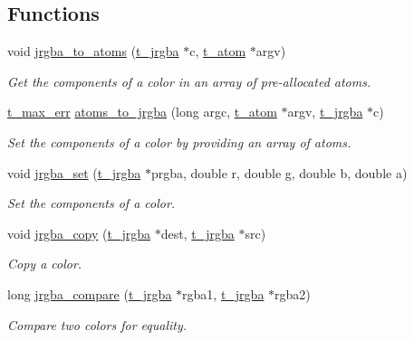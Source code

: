 \subsection*{Functions}
\begin{DoxyCompactItemize}
\item 
void \hyperlink{group__color_ga847dd3f1a2640660f12a14fab259afa8}{jrgba\_\-to\_\-atoms} (\hyperlink{structt__jrgba}{t\_\-jrgba} $\ast$c, \hyperlink{structt__atom}{t\_\-atom} $\ast$argv)
\begin{DoxyCompactList}\small\item\em Get the components of a color in an array of pre-\/allocated atoms. \item\end{DoxyCompactList}\item 
\hyperlink{group__datatypes_ga73edaae82b318855cc09fac994918165}{t\_\-max\_\-err} \hyperlink{group__color_ga78325ce33d8e74c79c4f1adeef3e36f7}{atoms\_\-to\_\-jrgba} (long argc, \hyperlink{structt__atom}{t\_\-atom} $\ast$argv, \hyperlink{structt__jrgba}{t\_\-jrgba} $\ast$c)
\begin{DoxyCompactList}\small\item\em Set the components of a color by providing an array of atoms. \item\end{DoxyCompactList}\item 
void \hyperlink{group__color_ga322f6e69277981f02effe1212affed3c}{jrgba\_\-set} (\hyperlink{structt__jrgba}{t\_\-jrgba} $\ast$prgba, double r, double g, double b, double a)
\begin{DoxyCompactList}\small\item\em Set the components of a color. \item\end{DoxyCompactList}\item 
void \hyperlink{group__color_ga24a7d1e24d38a91ab8aa02a48e5da70e}{jrgba\_\-copy} (\hyperlink{structt__jrgba}{t\_\-jrgba} $\ast$dest, \hyperlink{structt__jrgba}{t\_\-jrgba} $\ast$src)
\begin{DoxyCompactList}\small\item\em Copy a color. \item\end{DoxyCompactList}\item 
long \hyperlink{group__color_ga585ffc0ec76fe1b5d0e1c50e8eef0b39}{jrgba\_\-compare} (\hyperlink{structt__jrgba}{t\_\-jrgba} $\ast$rgba1, \hyperlink{structt__jrgba}{t\_\-jrgba} $\ast$rgba2)
\begin{DoxyCompactList}\small\item\em Compare two colors for equality. \item\end{DoxyCompactList}\item 

\end{DoxyCompactItemize}
